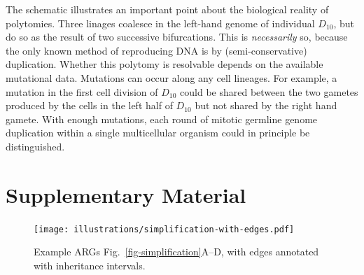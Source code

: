 \documentclass{article}
\begin{document}

The schematic illustrates an important point about the biological reality of polytomies.
Three linages coalesce in the left-hand genome of individual $D_{10}$, but do
so as the result of two successive bifurcations. This is \emph{necessarily} so,
because the only known method of reproducing DNA is by (semi-conservative) duplication.
Whether this polytomy is resolvable depends on the available mutational data.
Mutations can occur along any cell lineages. For example,
a mutation in the first cell division of $D_{10}$ could be shared between
the two gametes produced by the cells in the left half of $D_{10}$
but not shared by the right hand gamete.
With enough mutations, each
round of mitotic germline genome duplication within a single multicellular organism could
in principle be distinguished.


\clearpage
\renewcommand\thefigure{S\arabic{figure}}
\setcounter{figure}{0}
\renewcommand\thetable{S\arabic{table}}
\setcounter{table}{0}

\section*{Supplementary Material}

\begin{figure}[ht]
	\begin{center}
		\texttt{[image: illustrations/simplification-with-edges.pdf]}
	\end{center}
	\caption{\label{fig-simplification-with-edges}
	Example ARGs Fig.~\ref{fig-simplification}A--D,
    with edges annotated with inheritance intervals.
	}
\end{figure}
\end{document}
